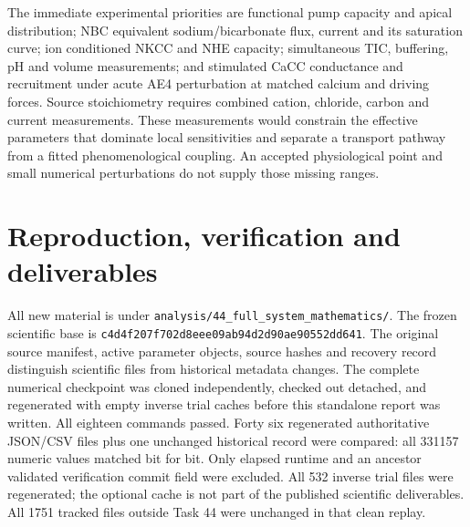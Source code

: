 \documentclass[11pt,a4paper]{article}
\begin{document}
The immediate experimental priorities are functional pump capacity and
apical distribution; NBC equivalent sodium/bicarbonate flux, current and
its saturation curve; ion conditioned NKCC and NHE capacity; simultaneous
TIC, buffering, pH and volume measurements; and stimulated CaCC conductance
and recruitment under acute AE4 perturbation at matched calcium and driving
forces. Source stoichiometry requires combined cation, chloride, carbon and
current measurements. These measurements would constrain the effective
parameters that dominate local sensitivities and separate a transport
pathway from a fitted phenomenological coupling. An accepted physiological
point and small numerical perturbations do not supply those missing ranges.

\section{Reproduction, verification and deliverables}
All new material is under \texttt{analysis/44\_full\_system\_mathematics/}.
The frozen scientific base is
\nolinkurl{c4d4f207f702d8eee09ab94d2d90ae90552dd641}.
The original source manifest, active parameter objects, source hashes and
recovery record distinguish scientific files from historical metadata changes.
The complete numerical checkpoint was cloned independently, checked out
detached, and regenerated with empty inverse trial caches before this
standalone report was written. All eighteen commands passed. Forty six
regenerated authoritative JSON/CSV files plus one unchanged historical
record were compared: all 331157 numeric values matched bit for bit.
Only elapsed runtime and an ancestor validated verification commit field
were excluded. All 532 inverse trial files were regenerated; the optional
cache is not part of the published scientific deliverables. All 1751 tracked
files outside Task 44 were unchanged in that clean replay.
\end{document}
